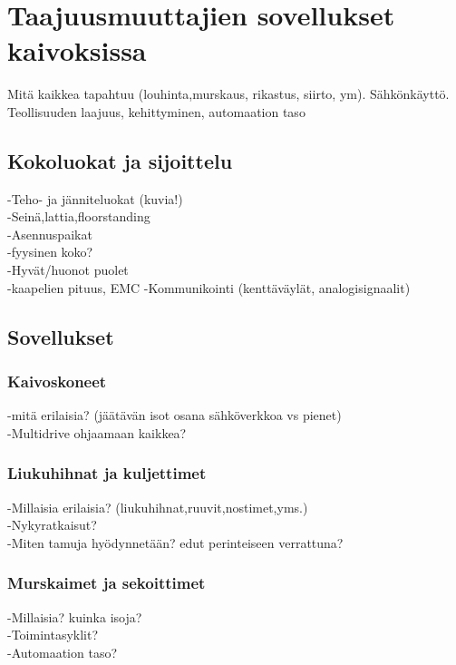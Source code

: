 \documentclass[finnish,12pt,a4paper,pdftex,elec,utf8]{aaltothesis}
\begin{document}





\clearpage


\section{Taajuusmuuttajien sovellukset kaivoksissa}
Mitä kaikkea tapahtuu (louhinta,murskaus, rikastus, siirto, ym). Sähkönkäyttö. Teollisuuden laajuus, kehittyminen, automaation taso

\subsection{Kokoluokat ja sijoittelu}
-Teho- ja jänniteluokat (kuvia!)\\
-Seinä,lattia,floorstanding\\
-Asennuspaikat\\
-fyysinen koko?\\
-Hyvät/huonot puolet\\
-kaapelien pituus, EMC
-Kommunikointi (kenttäväylät, analogisignaalit)

\subsection{Sovellukset}

\subsubsection{Kaivoskoneet}
-mitä erilaisia? (jäätävän isot osana sähköverkkoa vs pienet)\\
-Multidrive ohjaamaan kaikkea?


\subsubsection{Liukuhihnat ja kuljettimet}
-Millaisia erilaisia? (liukuhihnat,ruuvit,nostimet,yms.)\\
-Nykyratkaisut?\\
-Miten tamuja hyödynnetään? edut perinteiseen verrattuna?

\subsubsection{Murskaimet ja sekoittimet}
-Millaisia? kuinka isoja?\\
-Toimintasyklit? \cite{Hulthen}\\
-Automaation taso?
\end{document}
